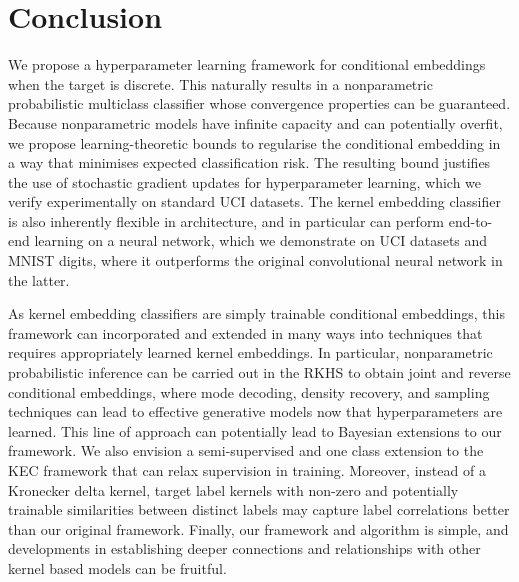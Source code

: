 \documentclass{article}
\begin{document}
\section{Conclusion}
	
	We propose a hyperparameter learning framework for conditional embeddings when the target is discrete. This naturally results in a nonparametric probabilistic multiclass classifier whose convergence properties can be guaranteed. Because nonparametric models have infinite capacity and can potentially overfit, we propose learning-theoretic bounds to regularise the conditional embedding in a way that minimises expected classification risk. The resulting bound justifies the use of stochastic gradient updates for hyperparameter learning, which we verify experimentally on standard UCI datasets. The kernel embedding classifier is also inherently flexible in architecture, and in particular can perform end-to-end learning on a neural network, which we demonstrate on UCI datasets and MNIST digits, where it outperforms the original convolutional neural network in the latter.
	
	As kernel embedding classifiers are simply trainable conditional embeddings, this framework can incorporated and extended in many ways into techniques that requires appropriately learned kernel embeddings. In particular, nonparametric probabilistic inference can be carried out in the RKHS to obtain joint and reverse conditional embeddings, where mode decoding, density recovery, and sampling techniques can lead to effective generative models now that hyperparameters are learned. This line of approach can potentially lead to Bayesian extensions to our framework. We also envision a semi-supervised and one class extension to the KEC framework that can relax supervision in training. Moreover, instead of a Kronecker delta kernel, target label kernels with non-zero and potentially trainable similarities between distinct labels may capture label correlations better than our original framework. Finally, our framework and algorithm is simple, and developments in establishing deeper connections and relationships with other kernel based models can be fruitful. 

\newpage


\end{document}

